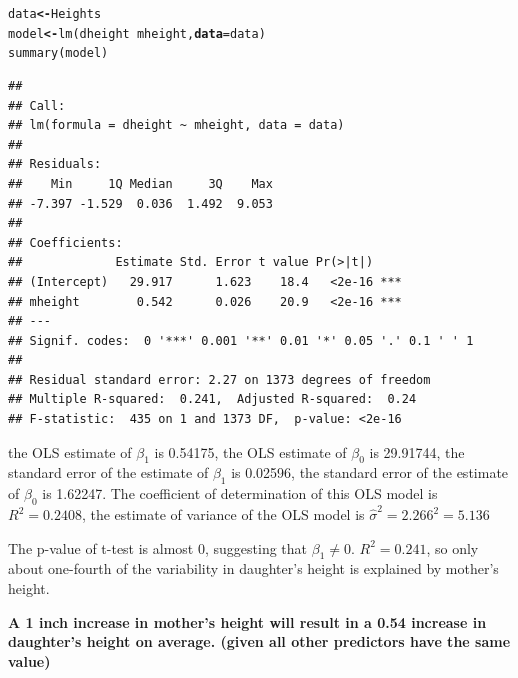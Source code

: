 \documentclass[12pt,oneside,a4paper]{article}\usepackage[]{graphicx}\usepackage[]{xcolor}
\makeatletter
\newcommand{\hlopt}[1]{\textcolor[rgb]{0,0,0}{#1}}%
\newcommand{\hlstd}[1]{\textcolor[rgb]{0,0,0}{#1}}%
\newcommand{\hlkwb}[1]{\textcolor[rgb]{0.498,0,0.333}{\textbf{#1}}}%
\newcommand{\hlkwc}[1]{\textcolor[rgb]{0.498,0,0.333}{\textbf{#1}}}%
\newcommand{\hlkwd}[1]{\textcolor[rgb]{0,0,0}{#1}}%
\newenvironment{kframe}{%
 \def\at@end@of@kframe{}%
 \ifinner\ifhmode%
  \def\at@end@of@kframe{\end{minipage}}%
  \begin{minipage}{\columnwidth}%
 \fi\fi%
 \def\FrameCommand##1{\hskip\@totalleftmargin \hskip-\fboxsep
 \colorbox{shadecolor}{##1}\hskip-\fboxsep
     \hskip-\linewidth \hskip-\@totalleftmargin \hskip\columnwidth}%
 \MakeFramed {\advance\hsize-\width
   \@totalleftmargin\z@ \linewidth\hsize
   \@setminipage}}%
 {\par\unskip\endMakeFramed%
 \at@end@of@kframe}
\newenvironment{knitrout}{}{} %
\makeatother
\begin{document}
\begin{knitrout}
\color{fgcolor}\begin{kframe}
\begin{alltt}
\hlstd{data} \hlkwb{<-} \hlstd{Heights}
\hlstd{model} \hlkwb{<-} \hlkwd{lm}\hlstd{(dheight} \hlopt{~} \hlstd{mheight,} \hlkwc{data} \hlstd{= data)}
\hlkwd{summary}\hlstd{(model)}
\end{alltt}
\begin{verbatim}
## 
## Call:
## lm(formula = dheight ~ mheight, data = data)
## 
## Residuals:
##    Min     1Q Median     3Q    Max 
## -7.397 -1.529  0.036  1.492  9.053 
## 
## Coefficients:
##             Estimate Std. Error t value Pr(>|t|)    
## (Intercept)   29.917      1.623    18.4   <2e-16 ***
## mheight        0.542      0.026    20.9   <2e-16 ***
## ---
## Signif. codes:  0 '***' 0.001 '**' 0.01 '*' 0.05 '.' 0.1 ' ' 1
## 
## Residual standard error: 2.27 on 1373 degrees of freedom
## Multiple R-squared:  0.241,	Adjusted R-squared:  0.24 
## F-statistic:  435 on 1 and 1373 DF,  p-value: <2e-16
\end{verbatim}
\end{kframe}
\end{knitrout}

the OLS estimate of $\beta_{1}$ is 0.54175, the OLS estimate of $\beta_{0}$ is 29.91744, the standard error of the estimate of $\beta_{1}$ is 0.02596, the standard error of the estimate of $\beta_{0}$ is 1.62247. The coefficient of determination of this OLS model is $R^{2} = 0.2408$, the estimate of variance of the OLS model is $\hat{\sigma}^2 = 2.266 ^ 2 = 5.136$

The p-value of t-test is almost 0, suggesting that $\beta_{1} \neq 0$. $R^2 = 0.241$, so only about one-fourth of the variability in daughter’s height is explained by mother’s height.

\textbf{A 1 inch increase in mother's height will result in a 0.54 increase in daughter's height on average. (given all other predictors have the same value)}
\end{document}
